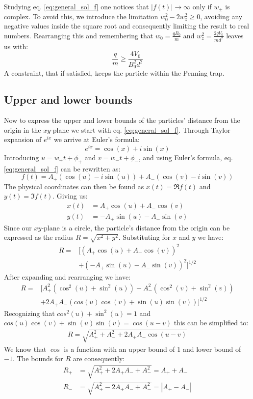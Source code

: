 \documentclass[english,notitlepage,reprint,nofootinbib]{revtex4-1}  %
\begin{document}
Studying eq. \ref{eq:general_sol_f} one notices that $|f(t)| \rightarrow \infty$ only if $w_\pm$ is complex. To avoid this, we introduce the limitation $w_0^2 - 2 w_z^2 \geq 0$, avoiding any negative values inside the square root and consequently limiting the result to real numbers. Rearranging this and remembering that $w_0 = \frac{qB_0}{m}$ and $w_z^2 = \frac{2qV_0}{md^2}$ leaves us with:
\begin{equation}
    \frac{q}{m} \geq \frac{4 V_0}{B_0^2 d^2}
\end{equation}
A constraint, that if satisfied, keeps the particle within the Penning trap.

\subsection*{Upper and lower bounds}
Now to express the upper and lower bounds of the particles' distance from the origin in the $xy$-plane
we start with eq. \ref{eq:general_sol_f}. Through Taylor expansion of $e^{ix}$ we arrive at Euler's formula:
\begin{equation*}
    e^{ix} = \cos(x) + i \sin(x)
\end{equation*}
Introducing $u =  w_+ t + \phi_+$ and $v = w_- t + \phi_-$, and using
Euler's formula, eq. \ref{eq:general_sol_f} can be rewritten as:
\begin{equation*}
    f(t) = A_+\left(\cos(u) - i \sin(u) \right) + A_-\left(\cos(v) - i \sin(v) \right)
\end{equation*}
The physical coordinates can then be found as $x(t) = \Re f(t)$ and  $y(t) = \Im f(t)$. Giving us:
\begin{align*}
    x(t) & = A_+ \cos(u) + A_- \cos(v)  \\
    y(t) & = -A_+ \sin(u) - A_- \sin(v)
\end{align*}
Since our $xy$-plane is a circle, the particle's distance from the origin can be expressed as the radius $R = \sqrt{x^2 + y^2}$.
Substituting for $x$ and $y$ we have:
\begin{align*}
    R = & [ (A_+ \cos(u) + A_- \cos(v))^2 \\ &+ (-A_+ \sin(u) - A_- \sin(v))^2 ]^{1/2}
\end{align*}
After expanding and rearranging we have:
\begin{align*}
    R = & [A_+^2(\cos^2(u) + \sin^2(u)) + A_-^2(\cos^2(v) + \sin^2(v)) \\ &+ 2 A_+ A_- (cos(u)\cos(v) + \sin(u)\sin(v))]^{1/2}
\end{align*}
Recognizing that $cos^2(u) + \sin^2(u) = 1$ and $cos(u)\cos(v) + \sin(u)\sin(v) = \cos(u-v)$ this can be simplified to:
\begin{align*}
    R = \sqrt{A_+^2 + A_-^2 + 2 A_+ A_- \cos(u-v)}
\end{align*}
We know that $\cos$ is a function with an upper bound of $1$ and lower bound of $-1$.
The bounds for $R$ are consequently:
\begin{align*}
    R_+ & = \sqrt{A_+^2 +2A_+ A_- + A_-^2} = A_+ + A_-   \\
    R_- & = \sqrt{A_+^2 -2A_+ A_- + A_-^2} = |A_+ - A_-|
\end{align*}
\end{document}
